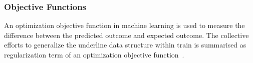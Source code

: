 \subsubsection{Objective Functions}
An optimization objective function in machine learning is used to measure the difference between the predicted outcome and expected outcome. The collective efforts to generalize the underline data structure within train is summarised as regularization term of an optimization objective function~\cite{goodfellow_2015}.  